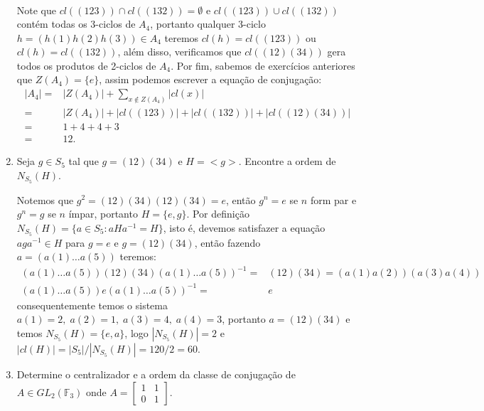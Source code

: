 \documentclass{article}
\begin{document}
\begin{enumerate}
\begin{enumerate}
$$\begin{aligned}
			\end{aligned}
			$$
			\end{enumerate}
			Note que $cl((123)) \cap cl((132)) = \emptyset$ e $cl((123)) \cup cl((132))$ contém todas os 3-ciclos de $A_{4}$, portanto qualquer 3-ciclo $h = (h(1)h(2)h(3)) \in A_{4}$ teremos $cl(h)= cl((123))$ ou $cl(h)= cl((132))$, além disso, verificamos que $cl((12)(34))$ gera todos os produtos de 2-ciclos de $A_{4}$. Por fim, sabemos de exercícios anteriores que $Z(A_{4}) = \{e\}$, assim podemos escrever a equação de conjugação:
			$$
			\begin{aligned}
			|A_{4}| = & |Z(A_{4})| + \sum_{x \notin Z(A_{4})} |cl(x)|
			\\
			=& |Z(A_{4})| + |cl((123))| + |cl((132))| + |cl((12)(34))|
			\\
			=& 1 + 4 + 4 +3
			\\
			=& 12.    
			\end{aligned}
			$$
		\item Seja $g \in S_{5}$ tal que $g=(12)(34)$ e $H=<g>$. Encontre a ordem de $N_{S_{5}}(H)$.
		
		Notemos que $g^{2} = (12)(34)(12)(34) = e$, então $g^{n} = e$ se $n$ form par e $g^{n} = g$ se $n$ ímpar, portanto $H = \{e, g\}$. Por definição $ N_{S_{5}}(H)= \{a \in S_{5}: aHa^{-1} = H\}$, isto é, devemos satisfazer a equação $aga^{-1} \in H$ para $g=e$ e $g = (12)(34)$, então fazendo $a = (a(1) \dots a(5))$ teremos:
		$$
		\begin{aligned}
		(a(1) \dots a(5))(12)(34)(a(1) \dots a(5))^{-1} = & (12)(34) = (a(1)a(2))(a(3)a(4)) 
		\\
		(a(1) \dots a(5))e(a(1) \dots a(5))^{-1} = & e
		\end{aligned}
		$$
		consequentemente temos o sistema $a(1)=2, \; a(2)=1, \; a(3)=4, \; a(4)=3$, portanto $a = (12)(34)$ e temos $N_{S_{5}}(H) = \{e, a\}$, logo $|N_{S_{5}}(H)| = 2$ e $|cl(H)| = |S_{5}|/|N_{S_{5}}(H)| = 120/2 = 60$.
		
		\item Determine o centralizador e a ordem da classe de conjugação de $A \in GL_{2}(\mathbb{F}_{3})$ onde 
		$
		A = 
		\left[
		\begin{array}{cc}
		1 & 1 \\
		0 & 1
		\end{array}
		\right].
		$
		

\end{enumerate}
\end{document}
